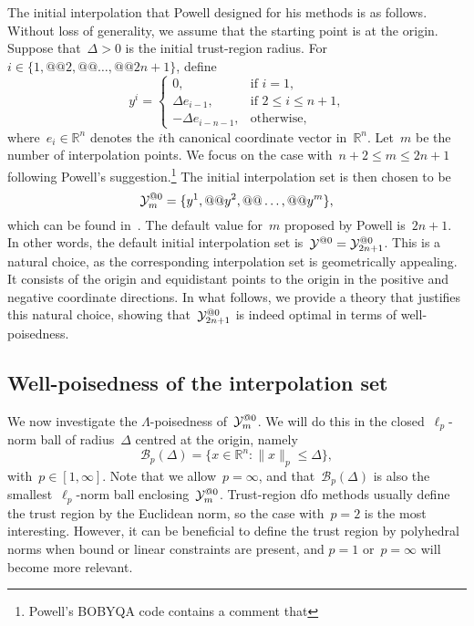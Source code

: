 \documentclass{article}
\makeatletter
\newcounter{cite}
\theoremstyle{definition}
\theoremstyle{plain}
\theoremstyle{remark}
\newcommand*{\norm}[2][]{#1\lVert#2#1\rVert}
\newcommand*{\set}[2][]{#1\{#2#1\}}
\newcommand*{\R}{\mathbb{R}}
\newcommand*{\xpt}[1][]{\mathcal{Y}\ifblank{#1}{}{^{@#1}}}
\makeatother
\begin{document}
The initial interpolation that Powell designed for his methods is as follows.
Without loss of generality, we assume that the starting point is at the origin.
Suppose that~$\Delta > 0$ is the initial trust-region radius.
For~$i \in \set{1, @@ 2, @@ \dots, @@ 2n + 1}$, define
\begin{equation}
    \label{eq:set-def}
    y^i =
    \begin{cases}
        0,                      & \text{if~$i = 1$,}\\
        \Delta e_{i - 1},       & \text{if~$2 \le i \le n + 1$,}\\
        -\Delta e_{i - n - 1},  & \text{otherwise},
    \end{cases}
\end{equation}
where~$e_i \in \R^n$ denotes the $i$th canonical coordinate vector in~$\R^n$.
Let~$m$ be the number of interpolation points.
We focus on the case with~$n + 2 \le m \le 2n + 1$ following Powell's suggestion.\footnote{Powell's BOBYQA code contains a comment that }
The initial interpolation set is then chosen to be
\begin{equation}
    \label{eq:set-def-m}
    \xpt[0]_m = \set{y^1, @@ y^2, @@ \dots, @@ y^m},
\end{equation}
which can be found in~\cite[Equation~(3.2)]{Powell_2006}.
The default value for~$m$ proposed by Powell is~$2n + 1$.
In other words, the default initial interpolation set is~$\xpt[0] = \xpt[0]_{2n + 1}$.
This is a natural choice, as the corresponding interpolation set is geometrically appealing.
It consists of the origin and equidistant points to the origin in the positive and negative coordinate directions.
In what follows, we provide a theory that justifies this natural choice, showing that~$\xpt[0]_{2n + 1}$ is indeed optimal in terms of well-poisedness.

\subsection{Well-poisedness of the interpolation set}

We now investigate the $\Lambda$-poisedness of~$\xpt[0]_m$.
We will do this in the closed~$\ell_p$-norm ball of radius~$\Delta$ centred at the origin, namely
\begin{equation*}
    \mathcal{B}_p(\Delta) = \set{x \in \R^n : \norm{x}_p \le \Delta},
\end{equation*}
with~$p \in [1, \infty]$.
Note that we allow~$p = \infty$, and that~$\mathcal{B}_p(\Delta)$ is also the smallest~$\ell_p$-norm ball enclosing~$\xpt[0]_m$.
Trust-region \gls{dfo} methods usually define the trust region by the Euclidean norm, so the case with~$p=2$ is the most
interesting.
However, it can be beneficial to define the trust region by polyhedral norms when bound or linear constraints are present, and $p = 1$ or~$p = \infty$ will become more relevant.
\end{document}
